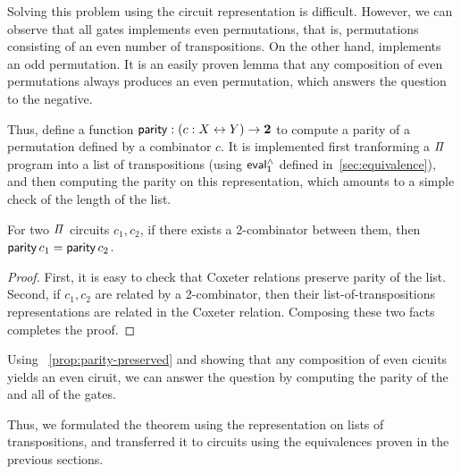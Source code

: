 Solving this problem using the circuit representation is difficult. However, we can observe that all  gates
implements even permutations, that is, permutations consisting of an even number of transpositions. On the other
hand,  implements an odd permutation. It is an easily proven lemma that any composition of even permutations
always produces an even permutation, which answers the question to the negative.
 
Thus, define a function $\operatorname{\mathsf{parity}} : (c : X \mathrel{\leftrightarrow} Y) \to {\mathbf{2}}$ to compute a parity of a permutation defined by a combinator
$c$. It is implemented first tranforming a $\mathit{\Pi}$ program into a list of transpositions (using $\evalh_{1}$
defined in~\cref{sec:equivalence}), and then computing the parity on this representation, which amounts to a simple check of the length of the list.

\begin{propositionrep}
  \label{prop:parity-preserved}
  For two $\mathit{\Pi}$ circuits $c_1, c_2$, if there exists a 2-combinator between them, then $\operatorname{\mathsf{parity}} c_1 = \operatorname{\mathsf{parity}} c_2$. 
\end{propositionrep}
\begin{proof}
  First, it is easy to check that Coxeter relations preserve parity of the list. Second, if $c_1, c_2$ are related by a
  2-combinator, then their list-of-transpositions representations are related in the Coxeter relation. Composing these
  two facts completes the proof.
\end{proof}

Using ~\cref{prop:parity-preserved} and showing that any composition of even cicuits yields an even ciruit, we can
answer the question by computing the parity of the  and all of the  gates. 

Thus, we formulated the theorem using the representation on lists of transpositions, and transferred it to circuits using
the equivalences proven in the previous sections.




